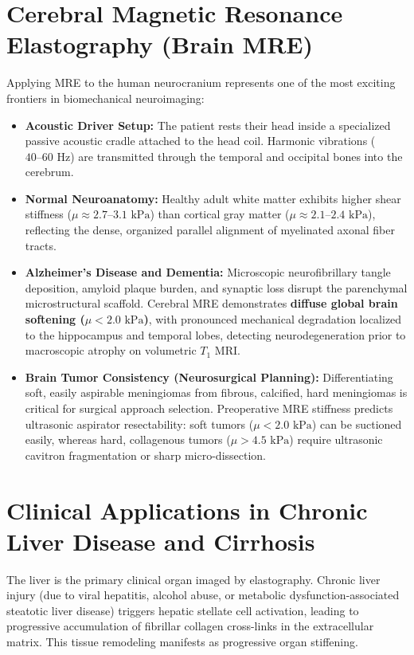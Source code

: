 \documentclass[11pt,a4paper]{article}
\begin{document}
\section{Cerebral Magnetic Resonance Elastography (Brain MRE)}
Applying MRE to the human neurocranium represents one of the most exciting frontiers in biomechanical neuroimaging:
\begin{itemize}[leftmargin=2em]
    \item \textbf{Acoustic Driver Setup:} The patient rests their head inside a specialized passive acoustic cradle attached to the head coil. Harmonic vibrations ($40\text{--}60\text{ Hz}$) are transmitted through the temporal and occipital bones into the cerebrum.
    \item \textbf{Normal Neuroanatomy:} Healthy adult white matter exhibits higher shear stiffness ($\mu \approx 2.7\text{--}3.1\text{ kPa}$) than cortical gray matter ($\mu \approx 2.1\text{--}2.4\text{ kPa}$), reflecting the dense, organized parallel alignment of myelinated axonal fiber tracts.
    \item \textbf{Alzheimer's Disease and Dementia:} Microscopic neurofibrillary tangle deposition, amyloid plaque burden, and synaptic loss disrupt the parenchymal microstructural scaffold. Cerebral MRE demonstrates \textbf{diffuse global brain softening ($\mu < 2.0\text{ kPa}$)}, with pronounced mechanical degradation localized to the hippocampus and temporal lobes, detecting neurodegeneration prior to macroscopic atrophy on volumetric $T_1$ MRI.
    \item \textbf{Brain Tumor Consistency (Neurosurgical Planning):} Differentiating soft, easily aspirable meningiomas from fibrous, calcified, hard meningiomas is critical for surgical approach selection. Preoperative MRE stiffness predicts ultrasonic aspirator resectability: soft tumors ($\mu < 2.0\text{ kPa}$) can be suctioned easily, whereas hard, collagenous tumors ($\mu > 4.5\text{ kPa}$) require ultrasonic cavitron fragmentation or sharp micro-dissection.
\end{itemize}

\section{Clinical Applications in Chronic Liver Disease and Cirrhosis}
The liver is the primary clinical organ imaged by elastography. Chronic liver injury (due to viral hepatitis, alcohol abuse, or metabolic dysfunction-associated steatotic liver disease) triggers hepatic stellate cell activation, leading to progressive accumulation of fibrillar collagen cross-links in the extracellular matrix. This tissue remodeling manifests as progressive organ stiffening.
\end{document}
